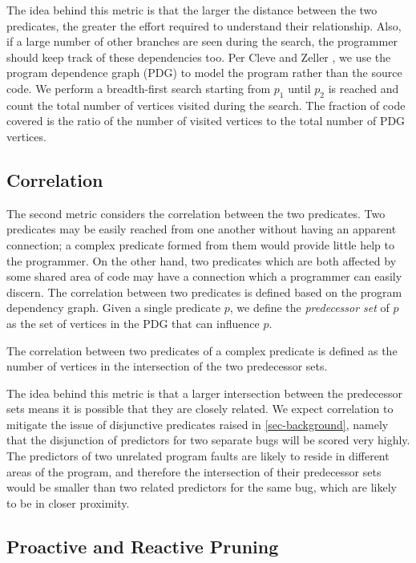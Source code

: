 The idea behind this metric is that the larger the distance between the two predicates, the greater the effort required to understand their relationship.  Also, if a large number of other branches are seen during the search, the programmer should keep track of these dependencies too.  Per Cleve and Zeller \cite{1062522}, we use the program dependence graph (PDG) to model the program rather than the source code.  We perform a breadth-first search starting from $p_1$ until $p_2$ is reached and count the total number of vertices visited during the search. The fraction of code covered is the ratio of the number of visited vertices to the total number of PDG vertices. 

\subsection{Correlation}

The second metric considers the correlation between the two predicates.  Two predicates may be easily reached from one another without having an apparent connection; a complex predicate formed from them would provide little help to the programmer.  On the other hand, two predicates which are both affected by some shared area of code may have a connection which a programmer can easily discern.  The correlation between two predicates is defined based on the program dependency graph.  Given a single predicate $p$, we define the \textit{predecessor set} of $p$ as the set of vertices in the PDG that can influence $p$.

\begin{defn}
\label{dfn5}
The correlation between two predicates of a complex predicate is defined as the number of vertices in the intersection of the two predecessor sets.
\end{defn}

The idea behind this metric is that a larger intersection between the predecessor sets means it is possible that they are closely related.  We expect correlation to mitigate the issue of disjunctive predicates raised in \autoref{sec-background}, namely that the disjunction of predictors for two separate bugs will be scored very highly.  The predictors of two unrelated program faults are likely to reside in different areas of the program, and therefore the intersection of their predecessor sets would be smaller than two related predictors for the same bug, which are likely to be in closer proximity.

\subsection{Proactive and Reactive Pruning}

